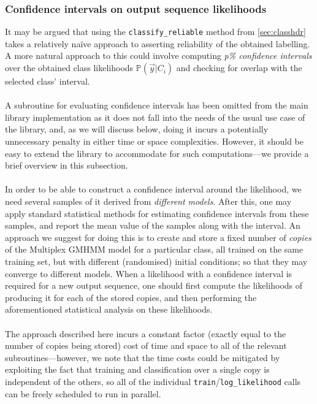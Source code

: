 \documentclass[12pt]{article}
\begin{document}
	\subsubsection{Confidence intervals on output sequence likelihoods}
	It may be argued that using the {\tt classify\_reliable} method from \cref{sec:classhdr} takes a relatively na\"{i}ve approach to asserting reliability of the obtained labelling. A more natural approach to this could involve computing \emph{p\% confidence intervals} over the obtained class likelihoods $\mathbb{P}(\vec{y}|C_i)$ and checking for overlap with the selected class' interval.\\ \\
	A subroutine for evaluating confidence intervals has been omitted from the main library implementation as it does not fall into the needs of the usual use case of the library, and, as we will discuss below, doing it incurs a potentially unnecessary penalty in either time or space complexities. However, it should be easy to extend the library to accommodate for such computations---we provide a brief overview in this subsection.\\ \\
	In order to be able to construct a confidence interval around the likelihood, we need several samples of it derived from \emph{different models}. After this, one may apply standard statistical methods for estimating confidence intervals from these samples, and report the mean value of the samples along with the interval. An approach we suggest for doing this is to create and store a fixed number of \emph{copies} of the Multiplex GMHMM model for a particular class, all trained on the same training set, but with different (randomised) initial conditions; so that they may converge to different models. When a likelihood with a confidence interval is required for a new output sequence, one should first compute the likelihoods of producing it for each of the stored copies, and then performing the aforementioned statistical analysis on these likelihoods.\\ \\
	The approach described here incurs a constant factor (exactly equal to the number of copies being stored) cost of time and space to all of the relevant subroutines---however, we note that the time costs could be mitigated by exploiting the fact that training and classification over a single copy is independent of the others, so all of the individual {\tt train}/{\tt log\_likelihood} calls can be freely scheduled to run in parallel.
\end{document}
